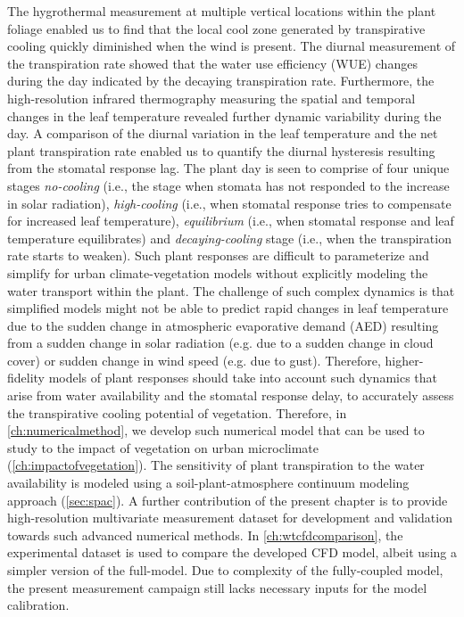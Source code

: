 The hygrothermal measurement at multiple vertical locations within the plant foliage enabled us to find that the local cool zone generated by transpirative cooling quickly diminished when the wind is present. The diurnal measurement of the transpiration rate showed that the water use efficiency (WUE) changes during the day indicated by the decaying transpiration rate. Furthermore, the high-resolution infrared thermography measuring the spatial and temporal changes in the leaf temperature revealed further dynamic variability during the day. A comparison of the diurnal variation in the leaf temperature and the net plant transpiration rate enabled us to quantify the diurnal hysteresis resulting from the stomatal response lag. The plant day is seen to comprise of four unique stages \textit{no-cooling} (i.e., the stage when stomata has not responded to the increase in solar radiation),\textit{ high-cooling} (i.e., when stomatal response tries to compensate for increased leaf temperature), \textit{equilibrium} (i.e., when stomatal response and leaf temperature equilibrates) and \textit{decaying-cooling} stage (i.e., when the transpiration rate starts to weaken). Such plant responses are difficult to parameterize and simplify for urban climate-vegetation models without explicitly modeling the water transport within the plant. The challenge of such complex dynamics is that simplified models might not be able to predict rapid changes in leaf temperature due to the sudden change in atmospheric evaporative demand (AED) resulting from a sudden change in solar radiation (e.g. due to a sudden change in cloud cover) or sudden change in wind speed (e.g. due to gust). Therefore, higher-fidelity models of plant responses should take into account such dynamics that arise from water availability and the stomatal response delay, to accurately assess the transpirative cooling potential of vegetation. Therefore, in \cref{ch:numericalmethod}, we develop such numerical model that can be used to study to the impact of vegetation on urban microclimate (\cref{ch:impactofvegetation}). The sensitivity of plant transpiration to the water availability is modeled using a soil-plant-atmosphere continuum modeling approach (\cref{sec:spac}). A further contribution of the present chapter is to provide high-resolution multivariate measurement dataset for development and validation towards such advanced numerical methods. In \cref{ch:wtcfdcomparison}, the experimental dataset is used to compare the developed CFD model, albeit using a simpler version of the full-model. Due to complexity of the fully-coupled model, the present measurement campaign still lacks necessary inputs for the model calibration.
